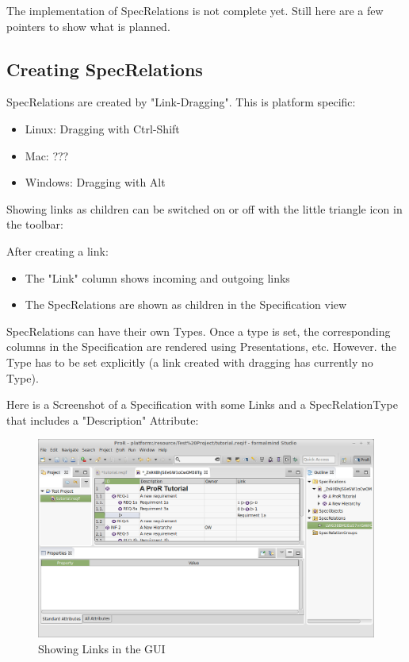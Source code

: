 The implementation of SpecRelations is not complete yet.  Still here are a few pointers to show what is planned.

\subsection{Creating SpecRelations}

SpecRelations are created by "Link-Dragging".  This is platform specific:

\begin{itemize}

\item
  Linux: Dragging with Ctrl-Shift
\item
  Mac: ???
\item
  Windows: Dragging with Alt
\end{itemize}

Showing links as children can be switched on or off with the little triangle icon in the toolbar:

After creating a link:

\begin{itemize}
\item
  The "Link" column shows incoming and outgoing links
\item
  The SpecRelations are shown as children in the Specification view
\end{itemize}

SpecRelations can have their own Types.  Once a type is set, the corresponding columns in the Specification are rendered using Presentations, etc.  However.  the Type has to be set explicitly (a link created with dragging has currently no Type).

Here is a Screenshot of a Specification with some Links and a SpecRelationType that includes a "Description" Attribute:

\begin{figure}[h!]      
\centering      
\includegraphics[width=\linewidth]{../rmf-images/links.png}      
\caption{Showing Links in the GUI}      
\label{fig:linksInGui}
\end{figure}

